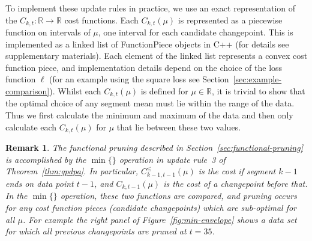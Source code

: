 \documentclass[aoas]{imsart}
\newtheorem{remark}{Remark}
\newcommand{\RR}{\mathbb R}
\begin{document}
To implement these update rules in practice, we use an exact
representation of the $C_{k,t}:\RR\rightarrow\RR$ cost functions. Each
$C_{k,t}(\mu)$ is represented as a piecewise function on intervals of
$\mu$, one interval for each candidate changepoint. This is
implemented as a linked list of FunctionPiece objects in C++ (for
details see supplementary materials). Each element of the linked list
represents a convex cost function piece, and implementation details
depend on the choice of the loss function $\ell$ (for an example using
the square loss see Section~\ref{sec:example-comparison}). Whilst each
$C_{k,t}(\mu)$ is defined for $\mu \in \RR$, it is trivial to show
that the optimal choice of any segment mean must lie within the range
of the data. Thus we first calculate the minimum and maximum of the
data and then only calculate each $C_{k,t}(\mu)$ for $\mu$ that lie
between these two values. 

\begin{remark}
  The functional pruning described in
  Section~\ref{sec:functional-pruning} is accomplished by the
  $\min\{\}$ operation in update rule~3 of Theorem~\ref{thm:gpdpa}. In
  particular, $C_{k-1,t-1}^\leq(\mu)$ is the cost if segment $k-1$
  ends on data point $t-1$, and $C_{k,t-1}(\mu)$ is the cost of a
  changepoint before that. In the $\min\{\}$ operation, these two
  functions are compared, and pruning occurs for any cost function
  pieces (candidate changepoints) which are sub-optimal for all $\mu$.
  For example the right panel of Figure~\ref{fig:min-envelope} shows a
  data set for which all previous changepoints are pruned at $t=35$.
\end{remark}
\end{document}
